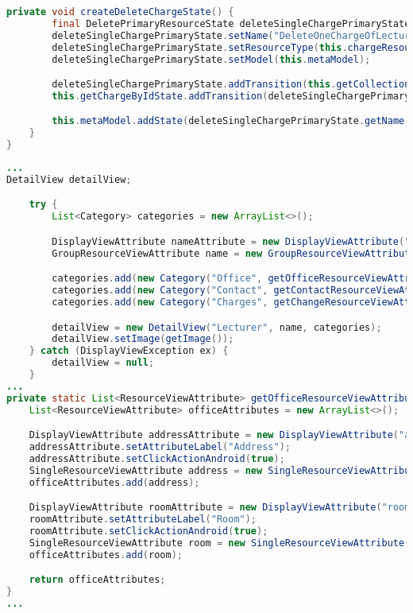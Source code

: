 \begin{lstlisting}[label=lst:enfield_model,
language=java,
firstnumber=1,
caption=Beschreibung des \textit{Enfield-Modell} der Referenzimplementierung. ]
	private void createDeleteChargeState() {
		final DeletePrimaryResourceState deleteSingleChargePrimaryState = new DeletePrimaryResourceState();
		deleteSingleChargePrimaryState.setName("DeleteOneChargeOfLecturer");
		deleteSingleChargePrimaryState.setResourceType(this.chargeResource);
		deleteSingleChargePrimaryState.setModel(this.metaModel);

		deleteSingleChargePrimaryState.addTransition(this.getCollectionOfChargesState, "getAllCharges");
		this.getChargeByIdState.addTransition(deleteSingleChargePrimaryState, "deleteCharge");

		this.metaModel.addState(deleteSingleChargePrimaryState.getName(), deleteSingleChargePrimaryState);
	}
}
\end{lstlisting}

\newpage

\begin{lstlisting}[label=lst:detailview_impl,
language=java,
firstnumber=1,
caption=Erstellung einer DetailView.]				   
...
DetailView detailView;

	try {
		List<Category> categories = new ArrayList<>();

		DisplayViewAttribute nameAttribute = new DisplayViewAttribute("name", ViewAttribute.AttributeType.TEXT);
		GroupResourceViewAttribute name = new GroupResourceViewAttribute(nameAttribute, getViewTitleAttributes());

		categories.add(new Category("Office", getOfficeResourceViewAttributes()));
		categories.add(new Category("Contact", getContactResourceViewAttributes()));
		categories.add(new Category("Charges", getChangeResourceViewAttributes()));

		detailView = new DetailView("Lecturer", name, categories);
		detailView.setImage(getImage());
	} catch (DisplayViewException ex) {
		detailView = null;
	}
...
private static List<ResourceViewAttribute> getOfficeResourceViewAttributes() {
	List<ResourceViewAttribute> officeAttributes = new ArrayList<>();

	DisplayViewAttribute addressAttribute = new DisplayViewAttribute("address", ViewAttribute.AttributeType.LOCATION);
	addressAttribute.setAttributeLabel("Address");
	addressAttribute.setClickActionAndroid(true);
	SingleResourceViewAttribute address = new SingleResourceViewAttribute(addressAttribute);
	officeAttributes.add(address);

	DisplayViewAttribute roomAttribute = new DisplayViewAttribute("roomNumber", ViewAttribute.AttributeType.TEXT);
	roomAttribute.setAttributeLabel("Room");
	roomAttribute.setClickActionAndroid(true);
	SingleResourceViewAttribute room = new SingleResourceViewAttribute(roomAttribute);
	officeAttributes.add(room);

	return officeAttributes;
}
...
\end{lstlisting}

